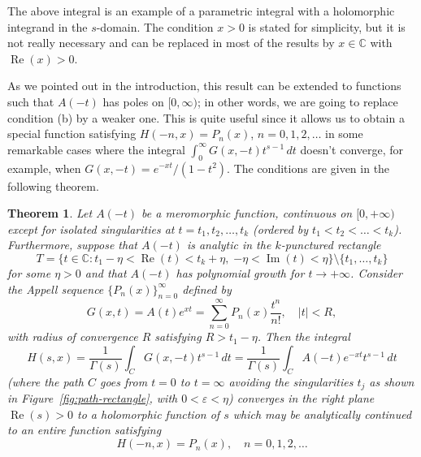 \documentclass[11pt,a4paper]{amsart}
\newcommand{\C}{\mathbb{C}}
\newcommand{\eps}{\varepsilon}
\renewcommand{\Re}{\operatorname{Re}}
\renewcommand{\Im}{\operatorname{Im}}
\theoremstyle{plain}
\newtheorem{theorem}{Theorem}[section]
\theoremstyle{plain}
\theoremstyle{remark}
\numberwithin{equation}{section}
\begin{document}
The above integral is an example of a parametric integral with a holomorphic integrand in the $s$-domain. The condition $x > 0$ is stated for simplicity, but it is not really necessary and can be replaced in most of the results by $x \in \C$ with $\Re(x)>0$. 

As we pointed out in the introduction, this result can be extended to functions such that $A(-t)$ has poles on $[0,\infty )$; in other words, we are going to replace condition (b) by a weaker one.
This is quite useful since it allows us to obtain a special function satisfying $H(-n,x) = P_n(x)$, $n=0,1,2,\dots$ in some remarkable cases where the integral $\int_0^{\infty} G(x,-t)t^{s-1}\,dt$ doesn't converge, for example, when $G(x,-t) = e^{-xt}/(1-t^2)$. The conditions are given in the following theorem.

\begin{theorem}
\label{teo:MAD-cont}
Let $A(-t)$ be a meromorphic function, continuous on $[0, +\infty)$ except for isolated singularities at $t=t_1,t_2,\dots,t_k$ (ordered by $t_1<t_2<\dots<t_k$).
Furthermore, suppose that $A(-t)$ is analytic in the $k$-punctured rectangle 
\[
  T = \{ t \in \C : t_1 - \eta < \Re(t) < t_k + \eta,\; {-\eta} < \Im(t) < \eta\}
  \setminus \{ t_1, \dots, t_k \}
\]
for some $\eta > 0$ and that $A(-t)$ has polynomial growth for $t\to +\infty$. 
Consider the Appell sequence $\{P_{n}(x)\}_{n=0}^{\infty}$ defined by
\[
	G(x,t) = A(t) e^{xt} = \sum_{n=0}^{\infty} P_{n}(x)\frac{t^n}{n!}, \quad |t|<R,
\]
with radius of convergence $R$ satisfying $R > t_1 - \eta$. Then the integral
\begin{equation}
\label{eq:MellinAC}
  H(s,x) = \frac{1}{\Gamma(s)} \int_{C} G(x,-t) t^{s-1}\,dt 
  = \frac{1}{\Gamma(s)} \int_{C} A(-t) e^{-xt} t^{s-1}\,dt
\end{equation}
(where the path $C$ goes from $t=0$ to $t=\infty$ avoiding the singularities $t_j$ as shown in Figure~\ref{fig:path-rectangle}, with $0<\eps<\eta$) converges in the right plane $\Re(s) > 0$ to a holomorphic function of $s$ which may be analytically continued to an entire function satisfying
\begin{equation*}
  H(-n,x) = P_{n}(x),\quad n=0,1,2,\dots
\end{equation*}
\end{theorem}
\end{document}
